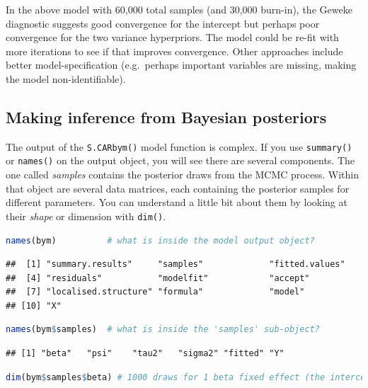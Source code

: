 \documentclass[
]{book}
\newcommand{\passthrough}[1]{#1}
\begin{document}
In the above model with 60,000 total samples (and 30,000 burn-in), the Geweke diagnostic suggests good convergence for the intercept but perhaps poor convergence for the two variance hyperpriors. The model could be re-fit with more iterations to see if that improves convergence. Other approaches include better model-specification (e.g.~perhaps important variables are missing, making the model non-identifiable).

\hypertarget{making-inference-from-bayesian-posteriors}{%
\subsection{Making inference from Bayesian posteriors}\label{making-inference-from-bayesian-posteriors}}

The output of the \passthrough{\lstinline!S.CARbym()!} model function is complex. If you use \passthrough{\lstinline!summary()!} or \passthrough{\lstinline!names()!} on the output object, you will see there are several components. The one called \emph{samples} contains the posterior draws from the MCMC process. Within that object are several data matrices, each containing the posterior samples for different parameters. You can understand a little bit about them by looking at their \emph{shape} or dimension with \passthrough{\lstinline!dim()!}.

\begin{lstlisting}[language=R]
names(bym)          # what is inside the model output object?
\end{lstlisting}

\begin{lstlisting}
##  [1] "summary.results"     "samples"             "fitted.values"      
##  [4] "residuals"           "modelfit"            "accept"             
##  [7] "localised.structure" "formula"             "model"              
## [10] "X"
\end{lstlisting}

\begin{lstlisting}[language=R]
names(bym$samples)  # what is inside the 'samples' sub-object?
\end{lstlisting}

\begin{lstlisting}
## [1] "beta"   "psi"    "tau2"   "sigma2" "fitted" "Y"
\end{lstlisting}

\begin{lstlisting}[language=R]
dim(bym$samples$beta) # 1000 draws for 1 beta fixed effect (the intercept)
\end{lstlisting}
\end{document}
